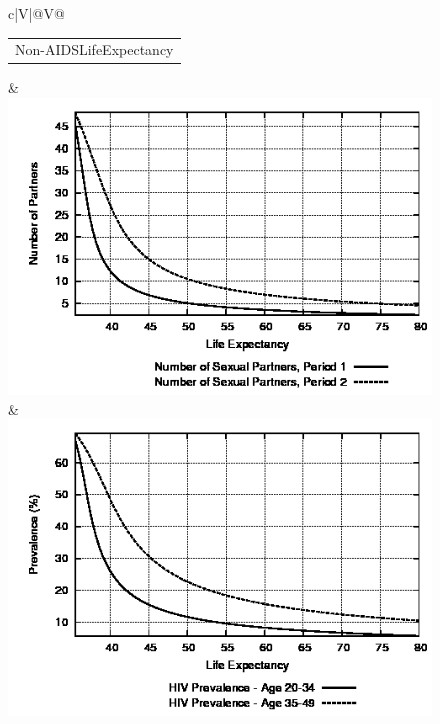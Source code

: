 \documentclass[12pt]{article}
\begin{document}
\begin{figure}
\begin{center}
\begin{tabular}{c|V|@{}V@{}}
\begin{tabular}{p{0.8in}}Non-AIDS\newline Life\newline Expectancy\\\end{tabular} & \includegraphics[scale=0.37]{images/mlife.png} & \includegraphics[scale=0.37]{images/hivlife.png} \\ \hline

\end{tabular}
\end{center}
\end{figure}
\end{document}
